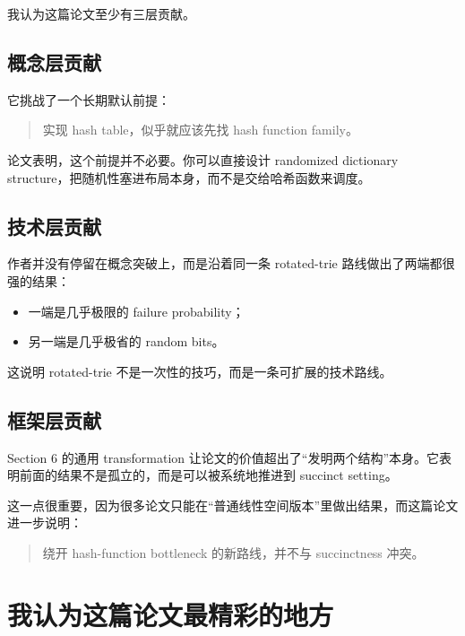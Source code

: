 \documentclass[12pt]{article}
\begin{document}
我认为这篇论文至少有三层贡献。

\subsection{概念层贡献}

它挑战了一个长期默认前提：

\begin{quote}实现 hash table，似乎就应该先找 hash function family。\end{quote}

论文表明，这个前提并不必要。你可以直接设计 randomized dictionary structure，把随机性塞进布局本身，而不是交给哈希函数来调度。

\subsection{技术层贡献}

作者并没有停留在概念突破上，而是沿着同一条 rotated-trie 路线做出了两端都很强的结果：

\begin{itemize}

\item 一端是几乎极限的 failure probability；

\item 另一端是几乎极省的 random bits。

\end{itemize}

这说明 rotated-trie 不是一次性的技巧，而是一条可扩展的技术路线。

\subsection{框架层贡献}

Section 6 的通用 transformation 让论文的价值超出了“发明两个结构”本身。它表明前面的结果不是孤立的，而是可以被系统地推进到 succinct setting。

这一点很重要，因为很多论文只能在“普通线性空间版本”里做出结果，而这篇论文进一步说明：

\begin{quote}绕开 hash-function bottleneck 的新路线，并不与 succinctness 冲突。\end{quote}

\section{我认为这篇论文最精彩的地方}
\end{document}
